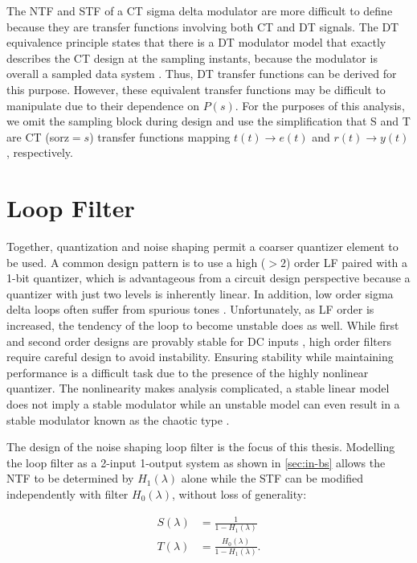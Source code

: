 The \gls{NTF} and \gls{STF} of a \gls{CT} sigma delta modulator are more difficult to define because they are transfer functions involving both \gls{CT} and \gls{DT} signals. The \gls{DT} equivalence principle states that there is a \gls{DT} modulator model that exactly describes the \gls{CT} design at the sampling instants, because the modulator is overall a sampled data system \cite[Sec. 3.2]{Ortmanns2005}. Thus, \gls{DT} transfer functions can be derived for this purpose. However, these equivalent transfer functions may be difficult to manipulate due to their dependence on $P(s)$. For the purposes of this analysis, we omit the sampling block during design and use the simplification that \gls{S} and \gls{T} are \gls{CT} (\gls{sorz}$=s$) transfer functions mapping $t(t) \rightarrow e(t)$ and $r(t) \rightarrow y(t)$, respectively.

\section{Loop Filter}
\label{sec:in-lf}

Together, quantization and noise shaping permit a coarser quantizer element to be used. A common design pattern is to use a high ($>2$) order \gls{LF} paired with a 1-bit quantizer, which is advantageous from a circuit design perspective because a quantizer with just two levels is inherently linear. In addition, low order sigma delta loops often suffer from spurious tones \cite[Sec. 2.6.1]{Schreier1997}. Unfortunately, as \gls{LF} order is increased, the tendency of the loop to become unstable does as well. While first and second order designs are provably stable for DC inputs \cite{Hein1993}, high order filters require careful design to avoid instability. Ensuring stability while maintaining performance is a difficult task due to the presence of the highly nonlinear quantizer. The nonlinearity makes analysis complicated, a stable linear model does not imply a stable modulator while an unstable model can even result in a stable modulator known as the chaotic type \cite{Risbo1994}.

The design of the noise shaping loop filter is the focus of this thesis. Modelling the loop filter as a 2-input 1-output system as shown in \autoref{sec:in-bs} allows the \gls{NTF} to be determined by $H_1(\lambda)$ alone while the \gls{STF} can be modified independently with filter $H_0(\lambda)$, without loss of generality:

\begin{align}
	S(\lambda) &= \frac{1}{1 - H_1(\lambda)} \\
	T(\lambda) &= \frac{H_0(\lambda)}{1 - H_1(\lambda)}. \label{eq:t}
\end{align}

